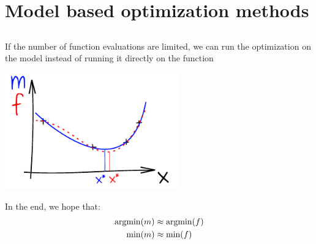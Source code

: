\section[Model based optim.]{Model based optimization methods}
\subsection{}

\begin{frame}{}
If the number of function evaluations are limited, we can run the optimization on the model instead of running it directly on the function
\begin{center}
\includegraphics[height=5cm]{4_optimization/figures/ink_mf}
\end{center}
In the end, we hope that:
\begin{equation*}
	\begin{split}
		\argmin(m) & \approx \argmin(f)\\
		\min(m) & \approx \min(f)\\
	\end{split}
\end{equation*}
\end{frame}

